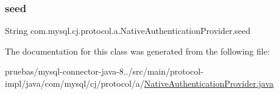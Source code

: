 \mbox{\label{classcom_1_1mysql_1_1cj_1_1protocol_1_1a_1_1_native_authentication_provider_a892979fa3727266691d4cbb0386adca2}} 
\subsubsection{\texorpdfstring{seed}{seed}}
{\footnotesize\ttfamily String com.\+mysql.\+cj.\+protocol.\+a.\+Native\+Authentication\+Provider.\+seed\hspace{0.3cm}{\ttfamily [protected]}}



The documentation for this class was generated from the following file\+:\begin{DoxyCompactItemize}
\item 
pruebas/mysql-\/connector-\/java-\/8../src/main/protocol-\/impl/java/com/mysql/cj/protocol/a/\mbox{\hyperlink{_native_authentication_provider_8java}{Native\+Authentication\+Provider.\+java}}\end{DoxyCompactItemize}
